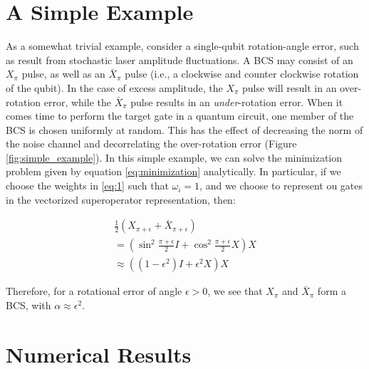 \documentclass[aps,nofootinbib,pra,notitlepage,twocolumn]{revtex4-1}
\begin{document}
\section{A Simple Example}
As a somewhat trivial example, consider a single-qubit rotation-angle error, such as result from stochastic laser amplitude fluctuations. A BCS may consist of an $X_\pi$ pulse, as well as an $\bar X_\pi$ pulse (i.e., a clockwise and counter clockwise rotation of the qubit). In the case of excess amplitude, the $X_\pi$ pulse will result in an over-rotation error, while the $\bar X_\pi$ pulse results in an \emph{under}-rotation error. When it comes time to perform the target gate in a quantum circuit, one member of the BCS is chosen uniformly at random. This has the effect of decreasing the norm of the noise channel and decorrelating the over-rotation error (Figure \ref{fig:simple_example}). In this simple example, we can solve the minimization problem given by equation \ref{eq:minimization} analytically. In particular, if we choose the weights in \ref{eq:1} such that $\omega_i=1$, and we choose to represent ou gates in the vectorized superoperator representation, then:

\begin{equation}
  \begin{gathered}
    \frac{1}{2}(X_{\pi + \epsilon} + \bar X_{\pi + \epsilon}) \\  
    = (\sin^2{\frac{\pi + \epsilon}{2}}I + \cos^2{\frac{\pi + \epsilon}{2}}X)X \\
    \approx ((1 - \epsilon^2)I + \epsilon^2X)X
  \end{gathered}
\end{equation}
 
Therefore, for a rotational error of angle $\epsilon > 0$, we see that $X_\pi$ and  $\bar X_\pi$  form a BCS, with $\alpha\approx\epsilon^2$.


\section{Numerical Results}\label{numerical}
\end{document}
